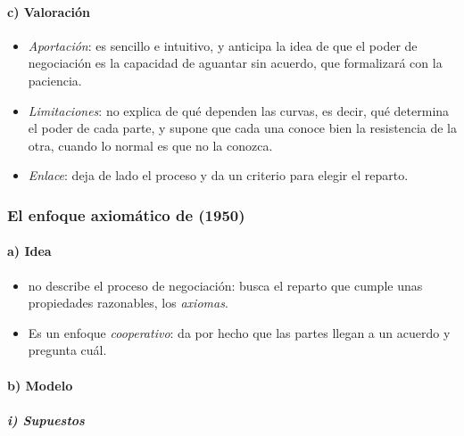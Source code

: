 \documentclass[11pt]{article}
\begin{document}
\paragraph{c) Valoración}

\begin{itemize}
\item \emph{Aportación}: es sencillo e intuitivo, y anticipa la idea de que el poder de negociación es la capacidad de aguantar sin acuerdo, que  formalizará con la paciencia.
\item \emph{Limitaciones}: no explica de qué dependen las curvas, es decir, qué determina el poder de cada parte, y supone que cada una conoce bien la resistencia de la otra, cuando lo normal es que no la conozca.
\item \emph{Enlace}:  deja de lado el proceso y da un criterio para elegir el reparto.
\end{itemize}

\subsubsection{El enfoque axiomático de  (1950)}\label{sec:nash}

\paragraph{a) Idea}

\begin{itemize}
\item \textcite{Nash1950Bargaining} no describe el proceso de negociación: busca el reparto que cumple unas propiedades razonables, los \emph{axiomas}.
\item Es un enfoque \emph{cooperativo}: da por hecho que las partes llegan a un acuerdo y pregunta cuál.
\end{itemize}

\paragraph{b) Modelo}

\subparagraph{i) Supuestos}
\end{document}
